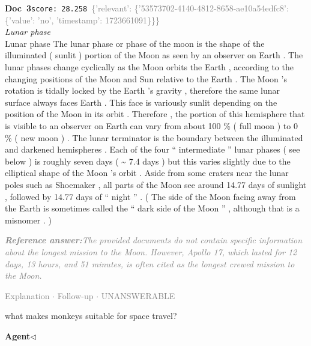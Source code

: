 \documentclass[a4paper,11pt]{article}
\begin{document}
\begin{docenv}
{\footnotesize\textcolor{doccolor}{\textbf{Doc~3}}}\hfill{\tiny\texttt{score:~28.258}}\ {\tiny\textcolor{gray}{\{'relevant': \{'53573702-4140-4812-8658-ae10a54edfc8': \{'value': 'no', 'timestamp': 1723661091\}\}\}}}\\[3pt]
{\small\textit{Lunar phase}}\\[2pt]
\vspace{2pt}
{\footnotesize Lunar phase
The lunar phase or phase of the moon is the shape of the illuminated ( sunlit ) portion of the Moon as seen by an observer on Earth . The lunar phases change cyclically as the Moon orbits the Earth , according to the changing positions of the Moon and Sun relative to the Earth . The Moon 's rotation is tidally locked by the Earth 's gravity , therefore the same lunar surface always faces Earth . This face is variously sunlit depending on the position of the Moon in its orbit . Therefore , the portion of this hemisphere that is visible to an observer on Earth can vary from about 100 \% ( full moon ) to 0 \% ( new moon ) . The lunar terminator is the boundary between the illuminated and darkened hemispheres . Each of the four `` intermediate '' lunar phases ( see below ) is roughly seven days ( \textasciitilde{} 7.4 days ) but this varies slightly due to the elliptical shape of the Moon 's orbit . Aside from some craters near the lunar poles such as Shoemaker , all parts of the Moon see around 14.77 days of sunlight , followed by 14.77 days of `` night '' . ( The side of the Moon facing away from the Earth is sometimes called the `` dark side of the Moon '' , although that is a misnomer . )}
\end{docenv}
\begin{refanswerenv}
{\footnotesize\textit{\textcolor{gray}{\textbf{Reference answer:}\enspace The provided documents do not contain specific information about the longest mission to the Moon. However, Apollo 17, which lasted for 12 days, 13 hours, and 51 minutes, is often cited as the longest crewed mission to the Moon.}}}
\end{refanswerenv}
\vspace{0.5em}
\hfill{\tiny\textcolor{gray}{Explanation $\cdot$ Follow-up $\cdot$ UNANSWERABLE}}
\begin{userbubble}
what makes monkeys suitable for space travel?
\end{userbubble}
\noindent\hfill{\small\textcolor{agentcolor}{\textbf{Agent\enspace$\triangleleft$}}}
\end{document}
